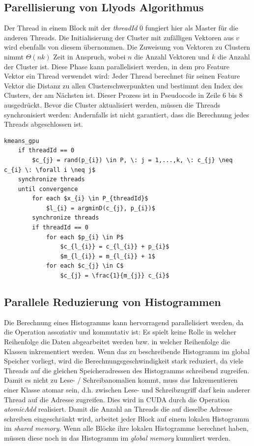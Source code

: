 \subsection{Parellisierung von Llyods Algorithmus}

Der Thread in einem Block mit der \textit{threadId} 0 fungiert hier als Master für die anderen Threads. Die Initialisierung der Cluster mit zufälligen Vektoren aus $v$ wird ebenfalls von diesem übernommen. Die Zuweisung von Vektoren zu Clustern nimmt $\Theta(nk)$ Zeit in Anspruch, wobei $n$ die Anzahl Vektoren und $k$ die Anzahl der Cluster ist. Diese Phase kann parallelisiert werden, in dem pro Feature Vektor ein Thread verwendet wird: Jeder Thread berechnet für seinen Feature Vektor die Distanz zu allen Clusterschwerpunkten und bestimmt den Index des Clusters, der am Nächsten ist. Dieser Prozess ist in Pseudocode in Zeile 6 bis 8 ausgedrückt. Bevor die Cluster aktualisiert werden, müssen die Threads synchronisiert werden: Andernfalls ist nicht garantiert, dass die Berechnung jedes Threads abgeschlossen ist.

\lstset{language=C}
\begin{lstlisting}[mathescape=true]
kmeans_gpu
	if threadId == 0
		$c_{j} = rand(p_{i}) \in P, \: j = 1,...,k, \: c_{j} \neq c_{i} \: \forall i \neq j$
	synchronize threads
	until convergence
		for each $x_{i} \in P_{threadId}$
			$l_{i} = argminD(c_{j}, p_{i})$
		synchronize threads
		if threadId == 0
			for each $p_{i} \in P$
				$c_{l_{i}} = c_{l_{i}} + p_{i}$
				$m_{l_{i}} = m_{l_{i}} + 1$
			for each $c_{j} \in C$
				$c_{j} = \frac{1}{m_{j}} c_{i}$
\end{lstlisting}

\subsection{Parallele Reduzierung von Histogrammen}

Die Berechnung eines Histogramms kann hervorragend parallelisiert werden, da die Operation assoziativ und kommutativ ist: Es spielt keine Rolle in welcher Reihenfolge die Daten abgearbeitet werden bzw. in welcher Reihenfolge die Klassen inkrementiert werden. Wenn das zu beschreibende Histogramm im global Speicher vorliegt, wird die Berechnungsgeschwindigkeit stark reduziert, da viele Threads auf die gleichen Speicheradressen des Histogramms schreibend zugreifen. Damit es nicht zu Lese- / Schreibanomalien kommt, muss das Inkrementieren einer Klasse atomar sein, d.h. zwischen Lese- und Schreibzugriff darf kein anderer Thread auf die Adresse zugreifen. Dies wird in CUDA durch die Operation \textit{atomicAdd} realisiert. Damit die Anzahl an Threads die auf dieselbe Adresse schreiben eingeschränkt wird, arbeitet jeder Block auf einem lokalen Histogramm im \textit{shared memory}. Wenn alle Blöcke ihre lokalen Histogramme berechnet haben, müssen diese noch in das Histogramm im \textit{global memory} kumuliert werden.

